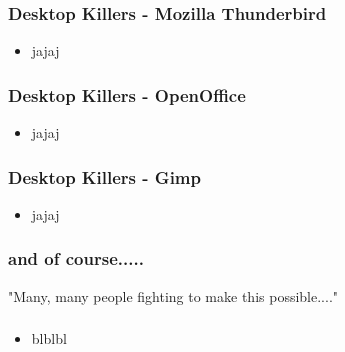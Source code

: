 \documentclass{beamer}
\begin{document}
\begin{frame}
\frametitle{Desktop Killers - Mozilla Thunderbird}

\begin{itemize}
\item jajaj
\end{itemize}

\end{frame}

\begin{frame}
\frametitle{Desktop Killers - OpenOffice}

\begin{itemize}
\item jajaj
\end{itemize}

\end{frame}

\begin{frame}
\frametitle{Desktop Killers - Gimp}

\begin{itemize}
\item jajaj
\end{itemize}

\end{frame}

\begin{frame}
\frametitle{and of course.....}

"Many, many people fighting to make this possible...."

\end{frame}



\begin{frame}
\frametitle{}

\begin{itemize}
\item blblbl
\end{itemize}

\end{frame}
\end{document}
